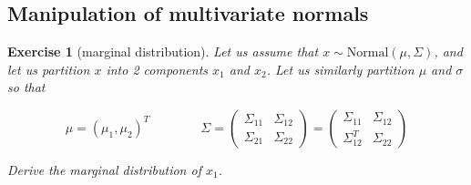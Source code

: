 \documentclass[twoside]{article}
\newcounter{lecnum}
\newtheorem{exercise}{Exercise}[lecnum]
\begin{document}
\subsection{Manipulation of multivariate normals}
\begin{exercise}[marginal distribution]
  Let us assume that $x\sim \mbox{Normal}(\mu, \Sigma)$, and let us partition $x$ into 2 components $x_1$ and $x_2$. Let us similarly partition $\mu$ and $\sigma$ so that

  $$\mu  = (\mu_1, \mu_2)^T \qquad \qquad \Sigma = \begin{pmatrix}\Sigma_{11} & \Sigma_{12} \\ \Sigma_{21} & \Sigma_{22}\end{pmatrix} = \begin{pmatrix}\Sigma_{11} & \Sigma_{12} \\ \Sigma_{12}^T & \Sigma_{22}\end{pmatrix}$$

  Derive the marginal distribution of $x_1$.
\end{exercise}
\end{document}
